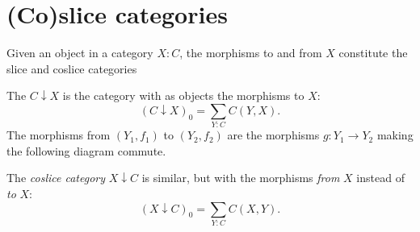 \section{(Co)slice categories}
Given an object in a category $ X: C $, the morphisms to and from $ X $ constitute the slice and coslice categories
\begin{definition}
  The  $ C \downarrow X $ is the category with as objects the morphisms to $ X $:
  \[ (C \downarrow X)_0 = \sum_{Y: C} C(Y, X). \]
  The morphisms from $ (Y_1, f_1) $ to $ (Y_2, f_2) $ are the morphisms $ g: Y_1 \to Y_2 $ making the following diagram commute.
  \begin{center}
  \end{center}
\end{definition}
The \textit{coslice category} $ X \downarrow C $ is similar, but with the morphisms \textit{from} $ X $ instead of \textit{to} $ X $:
\[ (X \downarrow C)_0 = \sum_{Y: C} C(X, Y). \]

